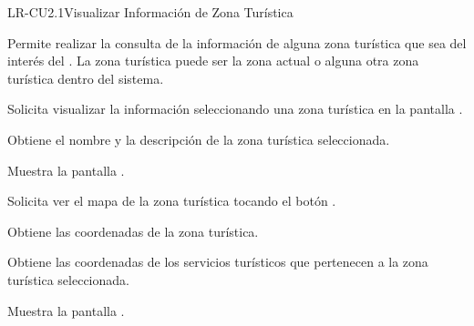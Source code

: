 
% 



	\begin{UseCase}{LR-CU2.1}{Visualizar Información de Zona Turística}{
		
		Permite realizar la consulta de la información de alguna zona turística que sea del interés del . La zona turística puede ser la zona actual o alguna otra zona turística dentro del sistema.\\
		
	}
	\end{UseCase}
	\begin{UCtrayectoria} 
		\UCpaso [\UCactor] Solicita visualizar la información seleccionando una zona turística en la pantalla .
		
		\UCpaso Obtiene el nombre y la descripción de la zona turística seleccionada.
		
		\UCpaso Muestra la pantalla . 
		
		\UCpaso [\UCactor] Solicita ver el mapa de la zona turística tocando el botón .
		
		\UCpaso Obtiene las coordenadas de la zona turística.
		
		\UCpaso Obtiene las coordenadas de los servicios turísticos que pertenecen a la zona turística seleccionada.
		
		\UCpaso \label{LR-CU2.1:Pantalla2} Muestra la pantalla .
		
	\end{UCtrayectoria}	

